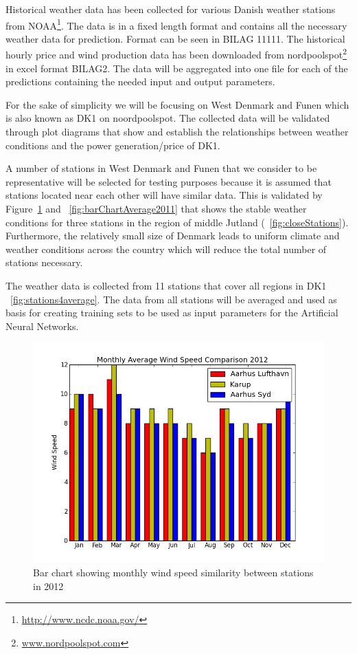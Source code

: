 Historical weather data has been collected for various Danish weather stations from NOAA\footnote{\url{http://www.ncdc.noaa.gov/}}. The data is in a fixed length format and contains all the necessary weather data for prediction. Format can be seen in BILAG 11111. 
The historical hourly price and wind production data has been downloaded from nordpoolspot\footnote{\url{www.nordpoolspot.com}} in excel format BILAG2.
The data will be aggregated into one file for each of the predictions containing the needed input and output parameters.

For the sake of simplicity we will be focusing on West Denmark and Funen which is also known as DK1 on noordpoolspot. The collected data will be validated through plot diagrams that show and establish the relationships between weather conditions and the power generation/price of DK1.

A number of stations in West Denmark and Funen that we consider to be representative will be selected for testing purposes because it is assumed that stations located near each other will have similar data. This is validated by Figure~\ref{fig:barChartAverage} and ~\ref{fig:barChartAverage2011} that shows the stable weather conditions for three stations in the region of middle Jutland (~\ref{fig:closeStations}). Furthermore, the relatively small size of Denmark leads to uniform climate and weather conditions across the country which will reduce the total number of stations necessary.

The weather data is collected from 11 stations that cover all regions in DK1 ~\ref{fig:stations4average}. The data from all stations will be averaged and used as basis for creating training sets to be used as input parameters for the Artificial Neural Networks.
\begin{figure}[H]
\centering
\includegraphics[width=0.85\linewidth,natwidth=898,natheight=587]{billeder/barChartMonthlyAverage.png}
\caption{Bar chart showing monthly wind speed similarity between stations in 2012}
\label{fig:barChartAverage}
\end{figure}

